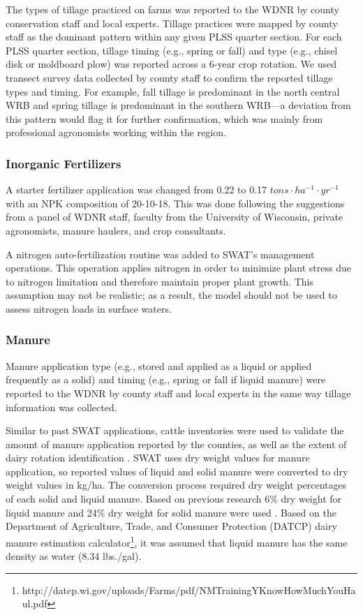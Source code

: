 The types of tillage practiced on farms was reported to the WDNR by county conservation staff and local experts. Tillage practices were mapped by county staff as the dominant pattern within any given PLSS quarter section. For each PLSS quarter section, tillage timing (e.g., spring or fall) and type (e.g., chisel disk or moldboard plow) was reported across a 6-year crop rotation. We used transect survey data collected by county staff to confirm the reported tillage types and timing. For example, fall tillage is predominant in the north central WRB and spring tillage is predominant in the southern WRB---a deviation from this pattern would flag it for further confirmation, which was mainly from professional agronomists working within the region.

\subsubsection{Inorganic Fertilizers}

A starter fertilizer application was changed from 0.22 to 0.17 $tons \cdot ha^{-1} \cdot yr^{-1}$ with an NPK composition of 20-10-18. This was done following the suggestions from a panel of WDNR staff, faculty from the University of Wisconsin, private agronomists, manure haulers, and crop consultants.

A nitrogen auto-fertilization routine was added to SWAT's management operations. 
This operation applies nitrogen in order to minimize plant stress due to nitrogen limitation and therefore maintain proper plant growth. This assumption may not be realistic; as a result, the model should not be used to assess nitrogen loads in surface waters.

\subsubsection{Manure}
Manure application type (e.g., stored and applied as a liquid or applied frequently as a solid) and timing (e.g., spring or fall if liquid manure) were reported to the WDNR by county staff and local experts in the same way tillage information was collected.

Similar to past SWAT applications, cattle inventories were used to validate the amount of manure application reported by the counties, as well as the extent of dairy rotation identification \citep{baumgart_source_2005, freihoefer_mead_2007, timm_swat_2011}. SWAT uses dry weight values for manure application, so reported values of liquid and solid manure were converted to dry weight values in kg/ha. The conversion process required dry weight percentages of each solid and liquid manure. Based on previous research 6\% dry weight for liquid manure and 24\% dry weight for solid manure were used . Based on the Department of Agriculture, Trade, and Consumer Protection (DATCP) dairy manure estimation calculator\footnote{http://datcp.wi.gov/uploads/Farms/pdf/NMTrainingYKnowHowMuchYouHaul.pdf}, it was assumed that liquid manure has the same density as water (8.34 lbs./gal).


